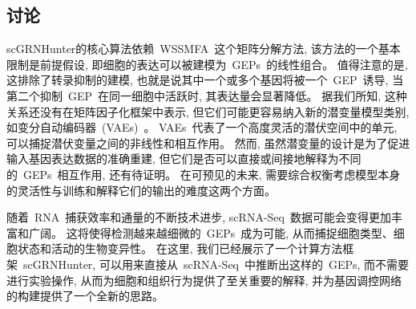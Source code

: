\subsection{讨论}
scGRNHunter的核心算法依赖~WSSMFA~这个矩阵分解方法, 该方法的一个基本限制是前提假设, 
即细胞的表达可以被建模为~GEPs~的线性组合。
值得注意的是, 这排除了转录抑制的建模, 也就是说其中一个或多个基因将被一个~GEP~诱导,
当第二个抑制~GEP~在同一细胞中活跃时, 其表达量会显著降低。
据我们所知, 这种关系还没有在矩阵因子化框架中表示, 但它们可能更容易纳入新的潜变量模型类别,
如变分自动编码器~(VAEs)~\cite{ding2018interpretable,gronbech2018scvae}。
VAEs~代表了一个高度灵活的潜伏空间中的单元, 可以捕捉潜伏变量之间的非线性和相互作用。
然而, 虽然潜变量的设计是为了促进输入基因表达数据的准确重建, 
但它们是否可以直接或间接地解释为不同的~GEPs~相互作用, 还有待证明。
在可预见的未来, 需要综合权衡考虑模型本身的灵活性与训练和解释它们的输出的难度这两个方面。

随着~RNA~捕获效率和通量的不断技术进步, scRNA-Seq~数据可能会变得更加丰富和广阔。
这将使得检测越来越细微的~GEPs~成为可能, 从而捕捉细胞类型、细胞状态和活动的生物变异性。
在这里, 我们已经展示了一个计算方法框架~scGRNHunter, 可以用来直接从~scRNA-Seq~中推断出这样的~GEPs, 
而不需要进行实验操作, 从而为细胞和组织行为提供了至关重要的解释, 并为基因调控网络的构建提供了一个全新的思路。